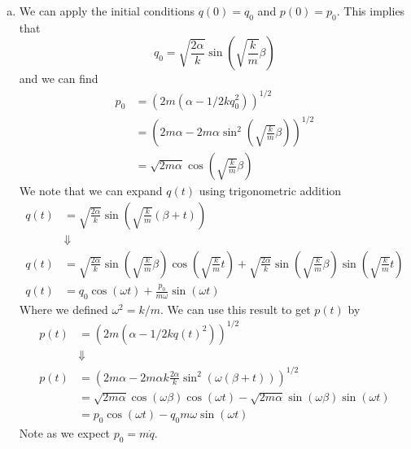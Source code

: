 \documentclass[11pt]{article}
\numberwithin{equation}{section}
\begin{document}
\begin{enumerate}[(a)]
\item We can apply the initial conditions $q(0) = q_0$ and $p(0) = p_0$. This implies that
$$q_0 = \sqrt{\frac{2\alpha}{k}}\sin\left(\sqrt{\frac{k}{m}}\beta\right)$$
and we can find 
\begin{align*}
p_0 &= \left(2m(\alpha-1/2kq_0^2)\right)^{1/2}\\
&= \left(2m\alpha-2m\alpha\sin^2\left(\sqrt{\frac{k}{m}}\beta\right)\right)^{1/2}\\
&= \sqrt{2m\alpha}\cos\left(\sqrt{\frac{k}{m}}\beta\right)
\end{align*}
We note that we can expand $q(t)$ using trigonometric addition
\begin{align*}
q(t) &= \sqrt{\frac{2\alpha}{k}}\sin\left(\sqrt{\frac{k}{m}}(\beta+t)\right)\\
&\Downarrow\\
q(t) &= \sqrt{\frac{2\alpha}{k}}\sin\left(\sqrt{\frac{k}{m}}\beta\right)\cos\left(\sqrt{\frac{k}{m}}t\right) + \sqrt{\frac{2\alpha}{k}}\sin\left(\sqrt{\frac{k}{m}}\beta\right)\sin\left(\sqrt{\frac{k}{m}}t\right)\\
q(t) &= q_0\cos\left(\omega{t}\right) + \frac{p_0}{m\omega}\sin\left(\omega{t}\right)
\end{align*}
Where we defined $\omega^2=k/m$. We can use this result to get $p(t)$ by
\begin{align*}
p(t) &= \left(2m(\alpha-1/2kq(t)^2)\right)^{1/2}\\
&\Downarrow\\
p(t) &= \left(2m\alpha-2m\alpha{k}\frac{2\alpha}{k}\sin^2(\omega(\beta+t))\right)^{1/2}\\
&= \sqrt{2m\alpha}\cos(\omega\beta)\cos(\omega{t}) - \sqrt{2m\alpha}\sin(\omega\beta)\sin(\omega{t})\\
&= p_0\cos(\omega{t}) - q_0m\omega\sin(\omega{t})
\end{align*}
Note as we expect $p_0 = m\dot{q}$.
\end{enumerate}

\pagebreak
\end{document}
